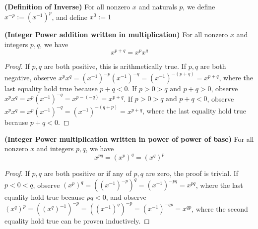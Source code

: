 \documentclass{report}
\begin{document}
\begin{definition}
\textbf{(Definition of Inverse)} For all nonzero $x$ and naturals $p$, we define $x^{-p}:=(x^{-1})^p$, and define $x^0:=1$ 
\end{definition}
\begin{theorem}  
  \label{1.2.8}
 \textbf{(Integer Power addition written in multiplication)} For all nonzero $x$ and integers $p,q$, we have 
 \begin{equation}
x^{p+q}=x^px^{q}
\end{equation}
\end{theorem}
\begin{proof}
  If $p,q$ are both positive, this is arithmetically true. If $p,q$ are both negative, observe $x^px^q=(x^{-1})^{-p}(x^{-1})^{-q}=(x^{-1})^{-(p+q)}=x^{p+q}$, where the last equality hold true because $p+q<0$. If $p>0>q\text{ and }p+q>0$, observe $x^px^q=x^p(x^{-1})^{-q}=x^{p-(-q)}=x^{p+q}$. If $p>0>q\text{ and }p+q<0$, observe $x^px^q=x^p(x^{-1})^{-q}=(x^{-1})^{-(q+p)}=x^{p+q}$, where the last equality hold true because $p+q<0.$ 
\end{proof}
\begin{theorem}
    \label{1.2.9}
\textbf{(Integer Power multiplication written in power of power of base)} For all nonzero $x$ and integers $p,q$, we have
\begin{equation}
  x^{pq}=(x^p)^q=(x^q)^p
\end{equation}
\end{theorem}
\begin{proof}
  If $p,q$ are both positive or if any of $p,q$ are zero, the proof is trivial. If $p<0<q$, observe $(x^p)^q=((x^{-1})^{-p})^q=(x^{-1})^{-pq}=x^{pq}$, where the last equality hold true because $pq<0$, and observe $(x^q)^p=((x^q)^{-1})^{-p}=((x^{-1})^{q})^{-p}=(x^{-1})^{-qp}=x^{qp}$, where the second equality hold true can be proven inductively.    
\end{proof}
\end{document}
